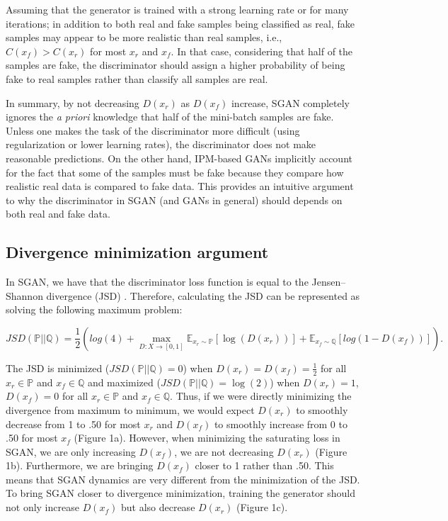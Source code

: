 \documentclass{article}
\begin{document}
Assuming that the generator is trained with a strong learning rate or for many iterations; in addition to both real and fake samples being classified as real, fake samples may appear to be more realistic than real samples, i.e., $C(x_f)>C(x_r)$ for most $x_r$ and $x_f$. In that case, considering that half of the samples are fake, the discriminator should assign a higher probability of being fake to real samples rather than classify all samples are real.

In summary, by not decreasing $D(x_{r})$ as $D(x_{f})$ increase, SGAN completely ignores the \textit{a priori} knowledge that half of the mini-batch samples are fake. Unless one makes the task of the discriminator more difficult (using regularization or lower learning rates), the discriminator does not make reasonable predictions. On the other hand, IPM-based GANs implicitly account for the fact that some of the samples must be fake because they compare how realistic real data is compared to fake data. This provides an intuitive argument to why the discriminator in SGAN (and GANs in general) should depends on both real and fake data.

\subsection{Divergence minimization argument}

In SGAN, we have that the discriminator loss function is equal to the Jensen–Shannon divergence (JSD) \citep{GAN}. Therefore, calculating the JSD can be represented as solving the following maximum problem:

\begin{equation}
JSD(\mathbb{P} || \mathbb{Q}) = \frac{1}{2} \left(log(4) + \max_{D:X \rightarrow [0,1]} \mathbb{E}_{x_r \sim \mathbb{P}}[\log(D(x_r))] + \mathbb{E}_{x_f \sim \mathbb{Q}}[log \left(1 - D(x_f) \right)] \right).
\end{equation}

The JSD is minimized ($JSD(\mathbb{P} || \mathbb{Q})=0$) when $D(x_r) = D(x_f) = \frac{1}{2}$ for all $x_r \in \mathbb{P}$ and $x_f \in \mathbb{Q}$ and maximized ($JSD(\mathbb{P} || \mathbb{Q})=\log(2)$) when $D(x_r)=1$, $D(x_f)=0$ for all $x_r \in \mathbb{P}$ and $x_f \in \mathbb{Q}$. Thus, if we were directly minimizing the divergence from maximum to minimum, we would expect $D(x_r)$ to smoothly decrease from 1 to .50 for most $x_r$ and $D(x_f)$ to smoothly increase from 0 to .50 for most $x_f$ (Figure 1a). However, when minimizing the saturating loss in SGAN, we are only increasing $D(x_f)$, we are not decreasing $D(x_r)$ (Figure 1b). Furthermore, we are bringing $D(x_f)$ closer to 1 rather than .50. This means that SGAN dynamics are very different from the minimization of the JSD. To bring SGAN closer to divergence minimization, training the generator should not only increase $D(x_f)$ but also decrease $D(x_r)$ (Figure 1c).
\end{document}
